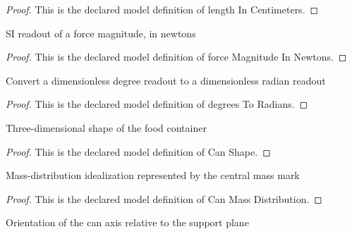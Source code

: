 \begin{proof}
  This is the declared model definition of length In Centimeters.
\end{proof}
\begin{definition}
  \label{def:physics:phyx-mini-0710:phyxminiproblems-problemphyxmini0710-forcemagnitudeinnewtons}
  SI readout of a force magnitude, in newtons
\end{definition}
\begin{proof}
  This is the declared model definition of force Magnitude In Newtons.
\end{proof}
\begin{definition}
  \label{def:physics:phyx-mini-0710:phyxminiproblems-problemphyxmini0710-degreestoradians}
  Convert a dimensionless degree readout to a dimensionless radian readout
\end{definition}
\begin{proof}
  This is the declared model definition of degrees To Radians.
\end{proof}
\begin{definition}
  \label{def:physics:phyx-mini-0710:phyxminiproblems-problemphyxmini0710-canshape}
  Three-dimensional shape of the food container
\end{definition}
\begin{proof}
  This is the declared model definition of Can Shape.
\end{proof}
\begin{definition}
  \label{def:physics:phyx-mini-0710:phyxminiproblems-problemphyxmini0710-canmassdistribution}
  Mass-distribution idealization represented by the central mass mark
\end{definition}
\begin{proof}
  This is the declared model definition of Can Mass Distribution.
\end{proof}
\begin{definition}
  \label{def:physics:phyx-mini-0710:phyxminiproblems-problemphyxmini0710-canorientation}
  Orientation of the can axis relative to the support plane
\end{definition}
